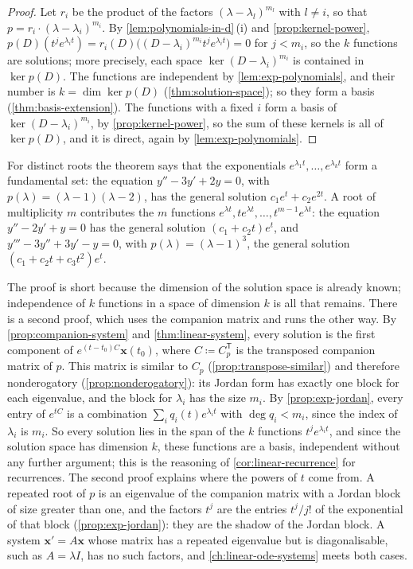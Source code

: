 \begin{proof}
Let $r_i$ be the product of the factors $(\lambda-\lambda_l)^{m_l}$ with $l\ne i$, so that $p=r_i\cdot(\lambda-\lambda_i)^{m_i}$. By \cref{lem:polynomials-in-d}\,(i) and \cref{prop:kernel-power}, $p(D)(t^je^{\lambda_it})=r_i(D)\bigl((D-\lambda_i)^{m_i}t^je^{\lambda_it}\bigr)=0$ for $j<m_i$, so the $k$ functions are solutions; more precisely, each space $\ker(D-\lambda_i)^{m_i}$ is contained in $\ker p(D)$. The functions are independent by \cref{lem:exp-polynomials}, and their number is $k=\dim\ker p(D)$ (\cref{thm:solution-space}); so they form a basis (\cref{thm:basis-extension}). The functions with a fixed $i$ form a basis of $\ker(D-\lambda_i)^{m_i}$, by \cref{prop:kernel-power}, so the sum of these kernels is all of $\ker p(D)$, and it is direct, again by \cref{lem:exp-polynomials}.
\end{proof}

For distinct roots the theorem says that the exponentials $e^{\lambda_1t},\ldots,e^{\lambda_kt}$ form a fundamental set: the equation $y''-3y'+2y=0$, with $p(\lambda)=(\lambda-1)(\lambda-2)$, has the general solution $c_1e^t+c_2e^{2t}$. A root of multiplicity $m$ contributes the $m$ functions $e^{\lambda t},te^{\lambda t},\ldots,t^{m-1}e^{\lambda t}$: the equation $y''-2y'+y=0$ has the general solution $(c_1+c_2t)e^t$, and $y'''-3y''+3y'-y=0$, with $p(\lambda)=(\lambda-1)^3$, the general solution $(c_1+c_2t+c_3t^2)e^t$.

The proof is short because the dimension of the solution space is already known; independence of $k$ functions in a space of dimension $k$ is all that remains. There is a second proof, which uses the companion matrix and runs the other way. By \cref{prop:companion-system} and \cref{thm:linear-system}, every solution is the first component of $e^{(t-t_0)C}\mathbf x(t_0)$, where $C\coloneqq C_p^{\mathsf T}$ is the transposed companion matrix of $p$. This matrix is similar to $C_p$ (\cref{prop:transpose-similar}) and therefore nonderogatory (\cref{prop:nonderogatory}): its Jordan form has exactly one block for each eigenvalue, and the block for $\lambda_i$ has the size $m_i$. By \cref{prop:exp-jordan}, every entry of $e^{tC}$ is a combination $\sum_iq_i(t)e^{\lambda_it}$ with $\deg q_i<m_i$, since the index of $\lambda_i$ is $m_i$. So every solution lies in the span of the $k$ functions $t^je^{\lambda_it}$, and since the solution space has dimension $k$, these functions are a basis, independent without any further argument; this is the reasoning of \cref{cor:linear-recurrence} for recurrences. The second proof explains where the powers of $t$ come from. A repeated root of $p$ is an eigenvalue of the companion matrix with a Jordan block of size greater than one, and the factors $t^j$ are the entries $t^j/j!$ of the exponential of that block (\cref{prop:exp-jordan}): they are the shadow of the Jordan block. A system $\mathbf x'=A\mathbf x$ whose matrix has a repeated eigenvalue but is diagonalisable, such as $A=\lambda I$, has no such factors, and \cref{ch:linear-ode-systems} meets both cases.

